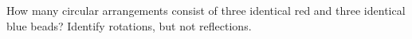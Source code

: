How many circular arrangements consist of three identical red and three identical blue beads? Identify rotations, but not reflections.
